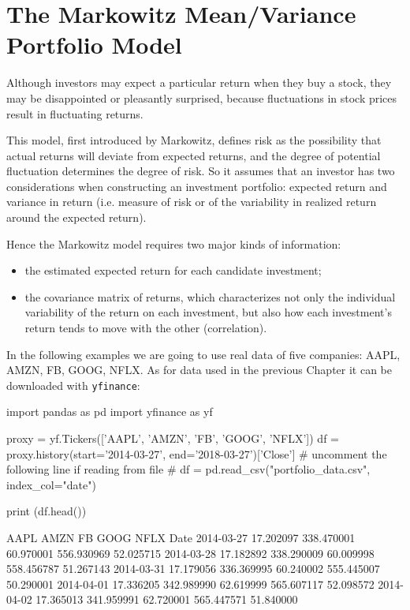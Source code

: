 \section{The Markowitz Mean/Variance Portfolio Model}
\label{the-markowitz-meanvariance-portfolio-model}

Although investors may expect a particular return when they buy a stock, they may be disappointed or pleasantly surprised, because fluctuations in stock prices result in fluctuating returns. 

This model, first introduced by Markowitz, defines risk as the possibility that actual returns will deviate from expected returns, and the degree of potential fluctuation determines the degree of risk.
So it assumes that an investor has two considerations when constructing an investment portfolio: expected return and variance in return (i.e. measure of risk or of the variability in realized return around the expected return). 

Hence the Markowitz model requires two major kinds of information:

\begin{itemize}
\tightlist
\item
  the estimated expected return for each candidate investment;
\item
  the covariance matrix of returns, which characterizes not only the 
  individual variability of the return on each investment, 
  but also how each investment's return tends to move with the other (correlation).
\end{itemize}

In the following examples we are going to use real data
of five companies:  AAPL, AMZN, FB, GOOG, NFLX. As for data used in the previous Chapter
it can be downloaded with \texttt{yfinance}:

\begin{ipython}
import pandas as pd
import yfinance as yf

proxy = yf.Tickers(['AAPL', 'AMZN', 'FB', 'GOOG', 'NFLX'])
df = proxy.history(start='2014-03-27', end='2018-03-27')['Close']
# uncomment the following line if reading from file
# df = pd.read_csv("portfolio_data.csv", index_col="date")

print (df.head())
\end{ipython}
\begin{ioutput}
                AAPL       AMZN        FB       GOOG      NFLX
Date
2014-03-27 17.202097 338.470001 60.970001 556.930969 52.025715
2014-03-28 17.182892 338.290009	60.009998 558.456787 51.267143
2014-03-31 17.179056 336.369995	60.240002 555.445007 50.290001
2014-04-01 17.336205 342.989990	62.619999 565.607117 52.098572
2014-04-02 17.365013 341.959991	62.720001 565.447571 51.840000
\end{ioutput}

